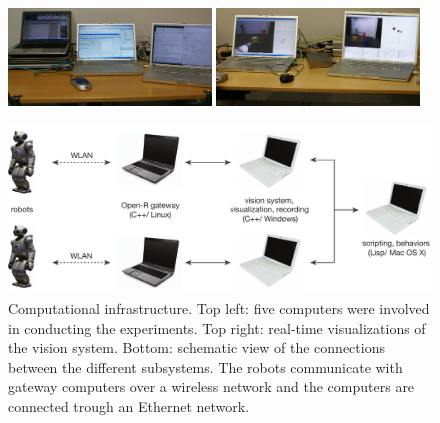 \begin{figure}[t]
  \parbox{\textwidth}{
  \includegraphics[width=0.48\textwidth]{figures/computer-infrastructure-1}%
  \hspace{0.04\textwidth}%
  \includegraphics[width=0.48\textwidth]{figures/computer-infrastructure-2}%
  \vspace{0.04\textwidth}
  
  \includegraphics[width=1\textwidth]{figures/computer-infrastructure-network}%
  \vspace{3mm}}
\caption{Computational infrastructure. Top left: five computers were
  involved in conducting the experiments. Top right: real-time
  visualizations of the vision system. Bottom: schematic view of the
  connections between the different subsystems. The robots communicate
  with gateway computers over a wireless network and the computers are
  connected trough an Ethernet network.}
  \label{f:computational-infrastructure}
\end{figure}

